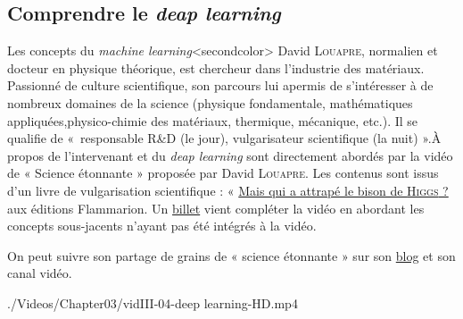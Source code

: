 \subsection[Comprendre le \textit{deap learning}]{Comprendre le \textit{deap learning}}
\label{sub:III.4.1}

Les concepts du \textit{machine learning}\caution[t]<secondcolor>{%
David \textsc{Louapre}, normalien et docteur en physique théorique, est chercheur dans l'industrie des matériaux. Passionné de culture scientifique, son parcours lui a\linebreak permis de s’intéresser à de nombreux domaines de la science (physique fondamentale, mathématiques appliquées,\linebreak physico-chimie des matériaux, thermi\-que, mécanique, etc.). Il se qualifie de «~responsable R{\&}D (le jour), vulgarisateur scientifique (la nuit) ».}{À propos de l'intervenant}
 et du \textit{deap learning} sont directement abordés par la vidéo de « Science étonnante » proposée par David \textsc{Louapre}. Les contenus sont issus d'un livre de vulgarisation scientifique : « \href{https://editions.flammarion.com/Catalogue/hors-collection/sciences/mais-qui-a-attrape-le-bison-de-higgs}{Mais qui a attrapé le bison de \textsc{Higgs} ?} aux éditions Flammarion. Un \href{https://scienceetonnante.com/2016/04/08/le-deep-learning/}{billet} vient compléter la vidéo en abordant les concepts sous-jacents n'ayant pas été intégrés à la vidéo.

On peut suivre son partage de grains de « science étonnante » sur son \href{https://scienceetonnante.com/}{blog} et son canal vidéo.

\begin{marginvideo}
	\vspace{2cm}%
		{./Videos/Chapter03/vidIII-04-deep learning-HD.mp4}%
\end{marginvideo}


